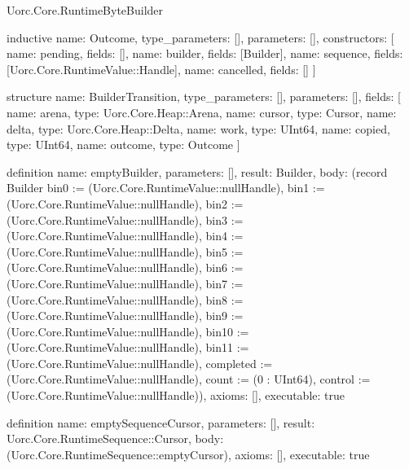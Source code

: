 \begin{lexlean}{Uorc.Core.RuntimeByteBuilder}
\begin{semanticmodule}
inductive{
  name: Outcome,
  type_parameters: [],
  parameters: [],
  constructors: [
    {name: pending, fields: []},
    {name: builder, fields: [Builder]},
    {name: sequence, fields: [Uorc.Core.RuntimeValue::Handle]},
    {name: cancelled, fields: []}
  ]
}

structure{
  name: BuilderTransition,
  type_parameters: [],
  parameters: [],
  fields: [
    {name: arena, type: Uorc.Core.Heap::Arena},
    {name: cursor, type: Cursor},
    {name: delta, type: Uorc.Core.Heap::Delta},
    {name: work, type: UInt64},
    {name: copied, type: UInt64},
    {name: outcome, type: Outcome}
  ]
}

definition{
  name: emptyBuilder,
  parameters: [],
  result: Builder,
  body: (record Builder {bin0 := (Uorc.Core.RuntimeValue::nullHandle), bin1 := (Uorc.Core.RuntimeValue::nullHandle), bin2 := (Uorc.Core.RuntimeValue::nullHandle), bin3 := (Uorc.Core.RuntimeValue::nullHandle), bin4 := (Uorc.Core.RuntimeValue::nullHandle), bin5 := (Uorc.Core.RuntimeValue::nullHandle), bin6 := (Uorc.Core.RuntimeValue::nullHandle), bin7 := (Uorc.Core.RuntimeValue::nullHandle), bin8 := (Uorc.Core.RuntimeValue::nullHandle), bin9 := (Uorc.Core.RuntimeValue::nullHandle), bin10 := (Uorc.Core.RuntimeValue::nullHandle), bin11 := (Uorc.Core.RuntimeValue::nullHandle), completed := (Uorc.Core.RuntimeValue::nullHandle), count := (0 : UInt64), control := (Uorc.Core.RuntimeValue::nullHandle)}),
  axioms: [],
  executable: true
}

definition{
  name: emptySequenceCursor,
  parameters: [],
  result: Uorc.Core.RuntimeSequence::Cursor,
  body: (Uorc.Core.RuntimeSequence::emptyCursor),
  axioms: [],
  executable: true
}


\end{semanticmodule}
\end{lexlean}
